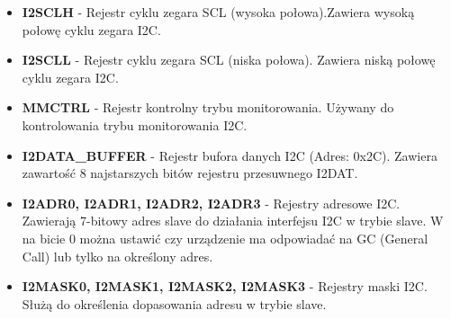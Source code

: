\documentclass{article}
\begin{document}
\begin{itemize}
    
    
    \item \textbf{I2SCLH} - Rejestr cyklu zegara SCL (wysoka połowa).Zawiera wysoką połowę cyklu zegara I2C.
    \item \textbf{I2SCLL} - Rejestr cyklu zegara SCL (niska połowa). Zawiera niską połowę cyklu zegara I2C.
    \item \textbf{MMCTRL} - Rejestr kontrolny trybu monitorowania. Używany do kontrolowania trybu monitorowania I2C.
    \item \textbf{I2DATA\_BUFFER} - Rejestr bufora danych I2C (Adres: 0x2C). Zawiera zawartość 8 najstarszych bitów rejestru przesuwnego I2DAT.
    
    \item \textbf{I2ADR0, I2ADR1, I2ADR2, I2ADR3} - Rejestry adresowe I2C. Zawierają 7-bitowy adres slave do działania interfejsu I2C w trybie slave. W na bicie 0 można ustawić czy urządzenie ma odpowiadać na GC (General Call) lub tylko na określony adres.
    \item \textbf{I2MASK0, I2MASK1, I2MASK2, I2MASK3} - Rejestry maski I2C. Służą do określenia dopasowania adresu w trybie slave.
\end{itemize}
\end{document}
